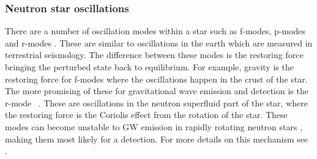 \subsubsection{Neutron star oscillations}
There are a number of oscillation modes within a star such as f-modes, p-modes
and r-modes \citep{becker2009NeutronStars}.  These are similar to oscillations
in the earth which are measured in terrestrial seismology.  The difference
between these modes is the restoring force bringing the perturbed state back to
equilibrium.  For example, gravity is the restoring force for f-modes where the
oscillations happen in the crust of the star.  The more promising of these for
gravitational wave emission and detection is the r-mode
\citep{lasky2015GravitationalWaves}~.
These are oscillations in the neutron superfluid part of the star, where the
restoring force is the Coriolis effect from the rotation of the star.  These
modes can become unstable to \gls{GW} emission in rapidly rotating neutron
stars \citep{lasky2015GravitationalWaves}, making them most likely for a
detection.  For more details on this mechanism see
\citep{lasky2015GravitationalWaves,owen1998GravitationalWaves,jonesCFSInstability}.~

